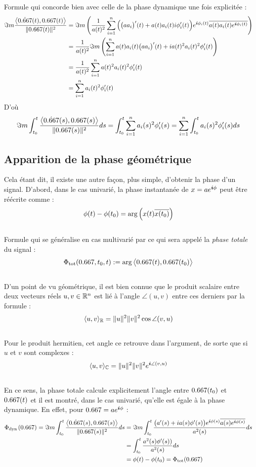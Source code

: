 Formule qui concorde bien avec celle de la phase dynamique une fois explicitée :
\begin{align*}
	\Im m\frac{\big\langle \dot{\x}(t) , \x(t) \big\rangle}{\|\x(t)\|^2} &= \Im m\left( \frac{1}{a(t)^2} \sum_{i=1}^n \Big( \big(aa_i\big)'(t) +a(t)a_i(t)i\phi_i'(t)\Big)e^{\i \phi_i(t)}\congu{a(t)a_i(t)e^{\i \phi_i(t)}} \right) \\
	&=\frac{1}{a(t)^2}  \Im m\left( \sum_{i=1}^n a(t)a_i(t)\big(aa_i\big)'(t) +ia(t)^2a_i(t)^2\phi_i'(t) \right) \\
	&= \frac{1}{a(t)^2} \sum_{i=1}^n a(t)^2a_i(t)^2 \phi_i'(t) \\
	&= \sum_{i=1}^n a_i(t)^2 \phi_i'(t)
\end{align*}
D'où
\[\Im m\int_{t_0}^t \frac{\big\langle \dot{\x}(s) , \x(s) \big\rangle}{\|\x(s)\|^2} ds = \int_{t_0}^t \sum_{i=1}^n a_i(s)^2 \phi_i'(s) = \sum_{i=1}^n \int_{t_0}^t a_i(s)^2 \phi_i'(s)ds\]
\skipl



\subsection{Apparition de la phase géométrique}\label{subsec:intro_phaseg}

Cela étant dit, il existe une autre façon, plus simple, d'obtenir la phase d'un signal. D'abord, dans le cas univarié, la phase instantanée de $x=ae^{\boldsymbol{i} \phi}$ peut être réécrite comme :
\[\phi(t)-\phi(t_0)  = \arg\left( x(t) \overline{x(t_0)} \right)\]
\\
Formule qui se généralise en cas multivarié par ce qui sera appelé la \emph{phase totale} du signal :
\begin{equation}\label{eq:phase_t}
	\phaset(\x, t_0, t) \defeq \arg\big\langle \x(t), \x(t_0)\big\rangle
\end{equation}
\\
D'un point de vu géométrique, il est bien connue que le produit scalaire entre deux vecteurs réels $u,v\in\mathbb{R}^n$ est lié à l'angle $\angle(u,v)$ entre ces derniers par la formule :
\[\langle u,v\rangle_{\mathbb{R}} = \|u\|^2 \|v\|^2 \cos \angle(v,u)\]
\\
Pour le produit hermitien, cet angle ce retrouve dans l'argument, de sorte que si $u$ et $v$ sont complexes :
\[\langle u,v\rangle_{\mathbb{C}} = \|u\|^2 \|v\|^2 e^{\boldsymbol{i}  \angle(v,u)}\]
\\
En ce sens, la phase totale calcule explicitement l'angle entre $\x(t_0)$ et $\x(t)$ et il est montré, dans le cas univarié, qu'elle est égale à la phase dynamique. En effet, pour $\x = ae^{\i \phi}$ :
\begin{align*}
	\phased(\x) = \Im m\int_{t_0}^t \frac{\big\langle \dot{\x}(s) , \x(s) \big\rangle}{\|\x(s)\|^2} ds &= \Im m \int_{t_0}^t \frac{\big(a'(s) + ia(s)\phi'(s) \big) e^{\i \phi(s)} \congu{a(s) e^{\i \phi(s)}}}{a^2(s)} ds \\
	&= \int_{t_0}^t \frac{a^2(s)\phi'(s))}{a^2(s)} ds \\
	&= \phi(t) - \phi(t_0) = \phaset(\x)
\end{align*}
\skipl

